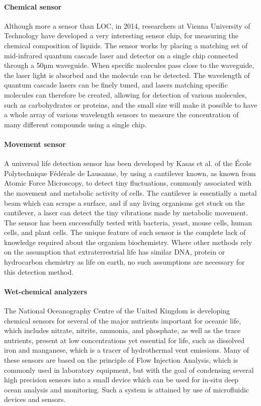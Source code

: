 \paragraph{Chemical sensor}
Although more a sensor than LOC, in 2014, researchers at Vienna University of Technology have developed a very interesting sensor chip, for measuring the chemical composition of liquids. The sensor works by placing a matching set of mid-infrared quantum cascade laser and detector on a single chip connected through a 50µm waveguide. When specific molecules pass close to the waveguide, the laser light is absorbed and the molecule can be detected. The wavelength of quantum cascade lasers can be finely tuned, and lasers matching specific molecules can therefore be created, allowing for detection of various molecules, such as carbohydrates or proteins, and the small size will make it possible to have a whole array of various wavelength sensors to measure the concentration of many different compounds using a single chip.

\paragraph{Movement sensor }
A universal life detection sensor has been developed by Kasas et al. of the École Polytechnique Fédérale de Lausanne, by using a cantilever known, as known from Atomic Force Microscopy, to detect tiny fluctuations, commonly associated with the movement and metabolic activity of cells. The cantilever is essentially a metal beam which can scrape a surface, and if any living organisms get stuck on the cantilever, a laser can detect the tiny vibrations made by metabolic movement. The sensor has been successfully tested with bacteria, yeast, mouse cells, human cells, and plant cells. The unique feature of such sensor is the complete lack of knowledge required about the organism biochemistry. Where other methods rely on the assumption that extraterrestrial life has similar DNA, protein or hydrocarbon chemistry as life on earth, no such assumptions are necessary for this detection method.

\paragraph{Wet-chemical analyzers}
The National Oceanography Centre of the United Kingdom is developing chemical sensors for several of the major nutrients important for oceanic life, which includes nitrate, nitrite, ammonia, and phosphate, as well as the trace nutrients, present at low concentrations yet essential for life, such as dissolved iron and manganese, which is a tracer of hydrothermal vent emissions.  Many of these sensors are based on the principle of Flow Injection Analysis, which is commonly used in laboratory equipment, but with the goal of condensing several high precision sensors into a small device which can be used for in-situ deep ocean analysis and monitoring. Such a system is attained by use of microfluidic devices and sensors.

